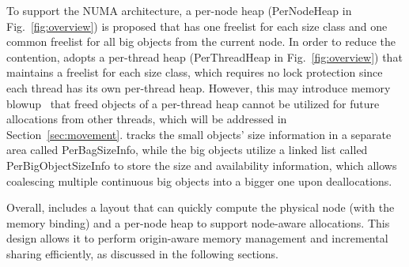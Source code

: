 To support the NUMA architecture, a per-node heap (PerNodeHeap in Fig.~\ref{fig:overview}) is proposed that has one freelist for each size class and one common freelist for all big objects from the current node. 
In order to reduce the contention, \NM{} adopts a per-thread heap (PerThreadHeap in Fig.~\ref{fig:overview}) that maintains a freelist for each size class, which requires no lock protection since each thread has its own per-thread heap. However, this may introduce memory blowup~\cite{Hoard} that freed objects of a per-thread heap cannot be utilized for future allocations from other threads, which will be addressed in Section~\ref{sec:movement}. 
\NM{} tracks the small objects' size information in a separate area called PerBagSizeInfo, while the big objects utilize a linked list called PerBigObjectSizeInfo to store the size and availability information, which allows coalescing multiple continuous big objects into a bigger one upon deallocations.



Overall, \NM{} includes a layout that can quickly compute the physical node (with the memory binding) and a per-node heap to support node-aware allocations. This design allows it to perform origin-aware memory management and incremental sharing efficiently, as discussed in the following sections.

